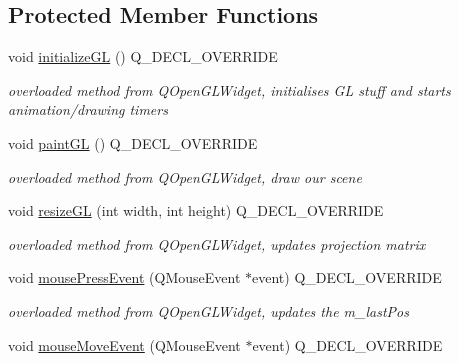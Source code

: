 \subsection*{Protected Member Functions}
\begin{DoxyCompactItemize}
\item 
void \hyperlink{classOpenGLScene_af9736a6bf7ba52614c7953d4f4e1778c}{initialize\+GL} () Q\+\_\+\+D\+E\+C\+L\+\_\+\+O\+V\+E\+R\+R\+I\+DE\hypertarget{classOpenGLScene_af9736a6bf7ba52614c7953d4f4e1778c}{}\label{classOpenGLScene_af9736a6bf7ba52614c7953d4f4e1778c}

\begin{DoxyCompactList}\small\item\em overloaded method from Q\+Open\+G\+L\+Widget, initialises GL stuff and starts animation/drawing timers \end{DoxyCompactList}\item 
void \hyperlink{classOpenGLScene_a172bd568ea2ba8b18e94dc8c0640bacd}{paint\+GL} () Q\+\_\+\+D\+E\+C\+L\+\_\+\+O\+V\+E\+R\+R\+I\+DE\hypertarget{classOpenGLScene_a172bd568ea2ba8b18e94dc8c0640bacd}{}\label{classOpenGLScene_a172bd568ea2ba8b18e94dc8c0640bacd}

\begin{DoxyCompactList}\small\item\em overloaded method from Q\+Open\+G\+L\+Widget, draw our scene \end{DoxyCompactList}\item 
void \hyperlink{classOpenGLScene_ae1c824958ef867f3009b24e841ef5842}{resize\+GL} (int width, int height) Q\+\_\+\+D\+E\+C\+L\+\_\+\+O\+V\+E\+R\+R\+I\+DE\hypertarget{classOpenGLScene_ae1c824958ef867f3009b24e841ef5842}{}\label{classOpenGLScene_ae1c824958ef867f3009b24e841ef5842}

\begin{DoxyCompactList}\small\item\em overloaded method from Q\+Open\+G\+L\+Widget, updates projection matrix \end{DoxyCompactList}\item 
void \hyperlink{classOpenGLScene_aaf2d0276c9b09112edb1d830e4258b78}{mouse\+Press\+Event} (Q\+Mouse\+Event $\ast$event) Q\+\_\+\+D\+E\+C\+L\+\_\+\+O\+V\+E\+R\+R\+I\+DE\hypertarget{classOpenGLScene_aaf2d0276c9b09112edb1d830e4258b78}{}\label{classOpenGLScene_aaf2d0276c9b09112edb1d830e4258b78}

\begin{DoxyCompactList}\small\item\em overloaded method from Q\+Open\+G\+L\+Widget, updates the m\+\_\+last\+Pos \end{DoxyCompactList}\item 
void \hyperlink{classOpenGLScene_afd390374341bd01f5f21b928d114d65c}{mouse\+Move\+Event} (Q\+Mouse\+Event $\ast$event) Q\+\_\+\+D\+E\+C\+L\+\_\+\+O\+V\+E\+R\+R\+I\+DE\hypertarget{classOpenGLScene_afd390374341bd01f5f21b928d114d65c}{}\label{classOpenGLScene_afd390374341bd01f5f21b928d114d65c}


\end{DoxyCompactItemize}
